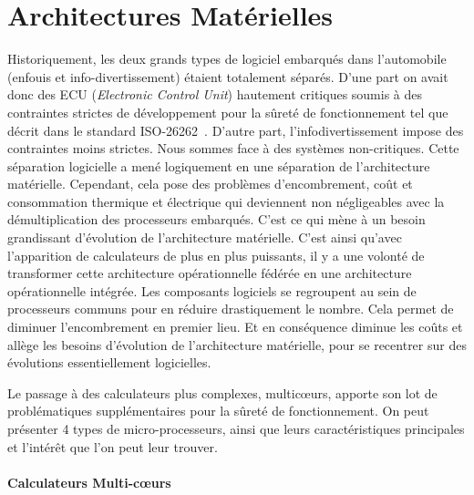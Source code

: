 \section{Architectures Matérielles}

Historiquement, les deux grands types de logiciel embarqués dans l'automobile (enfouis et info-divertissement) étaient totalement séparés. D'une part on avait donc des ECU (\textit{Electronic Control Unit}) hautement critiques soumis à des contraintes strictes de développement pour la sûreté de fonctionnement tel que décrit dans le standard ISO-26262~\cite{iso_26262-9_road_2018}. D'autre part, l'infodivertissement impose des contraintes moins strictes. Nous sommes face à des systèmes non-critiques.  Cette séparation logicielle a mené logiquement en une séparation de l'architecture matérielle. Cependant, cela pose des problèmes d'encombrement, coût et consommation thermique et électrique qui deviennent non négligeables avec la démultiplication des processeurs embarqués. C'est ce qui mène à un besoin grandissant d'évolution de l'architecture matérielle.
C'est ainsi qu'avec l'apparition de calculateurs de plus en plus puissants, il y a une volonté de transformer cette architecture opérationnelle fédérée en une architecture opérationnelle intégrée. Les composants logiciels se regroupent au sein de processeurs communs pour en réduire drastiquement le nombre. Cela permet de diminuer l'encombrement en premier lieu. Et en conséquence diminue les coûts et allège les besoins d'évolution de l'architecture matérielle, pour se recentrer sur des évolutions essentiellement logicielles.

Le passage à des calculateurs plus complexes, multic\oe{}urs, apporte son lot de problématiques supplémentaires pour la sûreté de fonctionnement. On peut présenter 4 types de micro-processeurs, ainsi que leurs caractéristiques principales et l'intérêt que l'on peut leur trouver.

\paragraph{Calculateurs Multi-c\oe{}urs}



